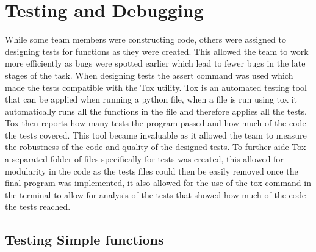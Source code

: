 \documentclass{article}
\begin{document}
\pagebreak

\section{Testing and Debugging}

While some team members were constructing code, others were assigned to designing tests for functions as they were created. This allowed the team to work more efficiently as bugs were spotted earlier which lead to fewer bugs in the late stages of the task. When designing tests the assert command was used which made the tests compatible with the Tox utility. Tox is an automated testing tool that can be applied when running a python file, when a file is run using tox it automatically runs all the functions in the file and therefore applies all the tests. Tox then reports how many tests the program passed and how much of the code the tests covered. This tool became invaluable as it allowed the team to measure the robustness of the code and quality of the designed tests. To further aide Tox a separated folder of files specifically for tests was created, this allowed for modularity in the code as the tests files could then be easily removed once the final program was implemented, it also allowed for the use of the tox command in the terminal to allow for analysis of the tests that showed how much of the code the tests reached.


\subsection{Testing Simple functions}
\end{document}
